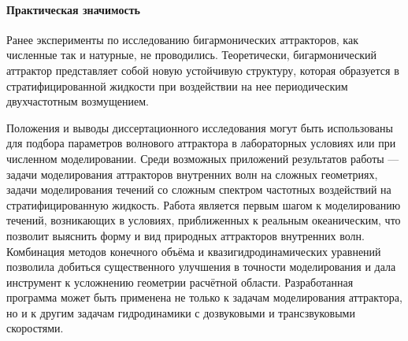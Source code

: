 \documentclass[utf8x]{G7-32} %
\begin{document}


 
\paragraph{Практическая значимость} 

Ранее эксперименты по исследованию бигармонических аттракторов, как численные так и натурные, не проводились. Теоретически, бигармонический аттрактор представляет собой новую устойчивую структуру, которая образуется в стратифицированной жидкости при воздействии на нее периодическим двухчастотным возмущением.

Положения и выводы диссертационного исследования могут быть использованы для подбора параметров  волнового аттрактора в лабораторных условиях или при численном моделировании. Среди возможных приложений результатов работы — задачи моделирования аттракторов внутренних волн на сложных геометриях, задачи моделирования течений со сложным спектром частотных воздействий на стратифицированную жидкость. Работа является первым шагом к моделированию течений, возникающих в условиях, приближенных к реальным океаническим, что позволит выяснить форму и вид природных аттракторов внутренних волн. Комбинация методов конечного объёма и квазигидродинамических уравнений позволила добиться существенного улучшения в точности моделирования и дала инструмент к  усложнению геометрии расчётной области. Разработанная программа может быть применена не только к задачам моделирования аттрактора, но и к другим задачам гидродинамики с дозвуковыми и трансзвуковыми скоростями.
\end{document}
